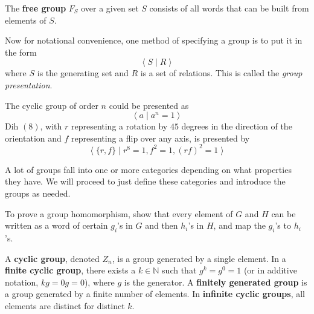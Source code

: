   \begin{definition}
    The \textbf{free group} $F_{S}$ over a given set $S$ consists of all words that can be built from elements of $S$. 
  \end{definition}

  Now for notational convenience, one method of specifying a group is to put it in the form
  \begin{equation}
    \big\langle \; S \; | \; R \;\big\rangle
  \end{equation}
  where $S$ is the generating set and $R$ is a set of relations. This is called the \textit{group presentation}. 

  \begin{example}
    The cyclic group of order $n$ could be presented as
    \begin{equation}
      \big\langle \; a \; | \; a^{n} = 1 \;\big\rangle
    \end{equation}
    Dih $(8)$, with $r$ representing a rotation by $45$ degrees in the direction of the orientation and $f$ representing a flip over any axis, is presented by
    \begin{equation}
      \big\langle \; \{ r, f\} \; | \; r^{8} = 1, f^{2} = 1, (r f)^{2} = 1 \;\big\rangle
    \end{equation}
  \end{example}

  A lot of groups fall into one or more categories depending on what properties they have. We will proceed to just define these categories and introduce the groups as needed. 


  \begin{theorem}[Tip]
    To prove a group homomorphism, show that every element of $G$ and $H$ can be written as a word of certain $g_i$'s in $G$ and then $h_i$'s in $H$, and map the $g_i$'s to $h_i$'s. 
  \end{theorem}

  \begin{definition}
    A \textbf{cyclic group}, denoted $Z_{n}$, is a group generated by a single element. In a \textbf{finite cyclic group}, there exists a $k \in \mathbb{N}$ such that $g^{k} = g^{0} = 1$ (or in additive notation, $kg = 0g = 0$), where $g$ is the generator. A \textbf{finitely generated group} is a group generated by a finite number of elements. In \textbf{infinite cyclic groups}, all elements are distinct for distinct $k$. 
  \end{definition} 

